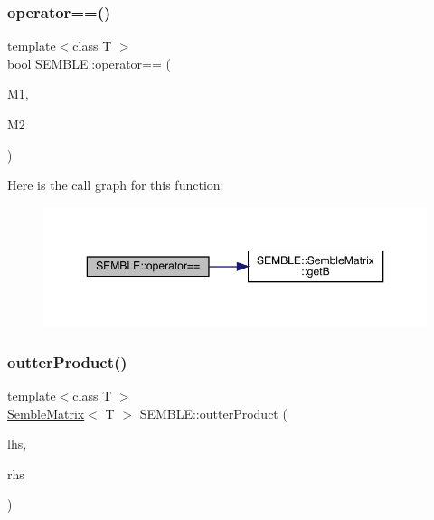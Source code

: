 \subsubsection{\texorpdfstring{operator==()}{operator==()}\hspace{0.1cm}{\footnotesize\ttfamily [2/2]}}
{\footnotesize\ttfamily template$<$class T $>$ \\
bool S\+E\+M\+B\+L\+E\+::operator== (\begin{DoxyParamCaption}\item[{const \mbox{\hyperlink{structSEMBLE_1_1SembleMatrix}{Semble\+Matrix}}$<$ T $>$ \&}]{M1,  }\item[{const \mbox{\hyperlink{structSEMBLE_1_1SembleMatrix}{Semble\+Matrix}}$<$ T $>$ \&}]{M2 }\end{DoxyParamCaption})}

Here is the call graph for this function\+:
\nopagebreak
\begin{figure}[H]
\begin{center}
\leavevmode
\includegraphics[width=350pt]{d7/dfd/namespaceSEMBLE_a04e3d846fff45a4b9a5b72b722bc949e_cgraph}
\end{center}
\end{figure}
\mbox{\label{namespaceSEMBLE_a2d350ec19bb9d35ba9a92cc043a06a95}} 
\subsubsection{\texorpdfstring{outterProduct()}{outterProduct()}}
{\footnotesize\ttfamily template$<$class T $>$ \\
\mbox{\hyperlink{structSEMBLE_1_1SembleMatrix}{Semble\+Matrix}}$<$ T $>$ S\+E\+M\+B\+L\+E\+::outter\+Product (\begin{DoxyParamCaption}\item[{const \mbox{\hyperlink{structSEMBLE_1_1SembleVector}{Semble\+Vector}}$<$ T $>$ \&}]{lhs,  }\item[{const \mbox{\hyperlink{structSEMBLE_1_1SembleVector}{Semble\+Vector}}$<$ T $>$ \&}]{rhs }\end{DoxyParamCaption})}


